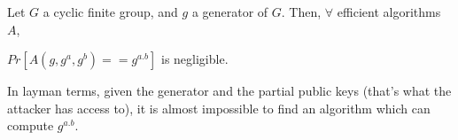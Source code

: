 \begin{mytheorem}
Let $G$ a cyclic finite group, and $g$ a generator of $G$.
Then, $\forall$ efficient algorithms $A$,
\begin{flushright}
	$Pr[ A(g,g^a,g^{b}) == g^{a.b} ]$ is negligible.
\end{flushright} 
\end{mytheorem}
 
 In layman terms, given the generator and the partial public keys (that's what the attacker has access to), it is almost impossible to find an algorithm which can compute $g^{a.b}$.

